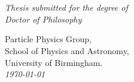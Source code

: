 \newcolumntype{$}{>{\global\let\currentrowstyle\relax}}
\newcolumntype{^}{>{\currentrowstyle}}
\newcommand{\rowstyle}[1]{\gdef\currentrowstyle{#1}%
  #1\ignorespaces
}



\begin{titlepage}
  \begin{center}
    \huge\sc\linespread{2} \thesistitle\\
    \end{center}
    \begin{center}
    \vspace{3.0cm}
    {\Large\bf \thesisauthor}\\
    \vspace{1.5cm}
    {\large\em Thesis submitted for the degree of}\\
    {\large\em Doctor of Philosophy}\\
    \vspace{1.5cm}
  \end{center}
  \begin{center}
  \end{center}
  \begin{flushleft}
    \hspace{7.5cm} Particle Physics Group, \\
    \hspace{7.5cm} School of Physics and Astronomy, \\
    \hspace{7.5cm} University of Birmingham. \\
    \vspace{1cm}
    \hspace{7.5cm} \emph{\today} \\
  \end{flushleft}
  \begin{center}
  \end{center}
\end{titlepage}

\thispagestyle{empty}%
~
\newpage


\pagestyle{fancy} %
\fancyfoot{} %
\fancyhead{}
\fancyhead[RE]{\sf \slshape \rightmark \hspace{5mm} \thepage }
\fancyhead[LO]{\sf \thepage \hspace{5mm} \slshape \leftmark }

